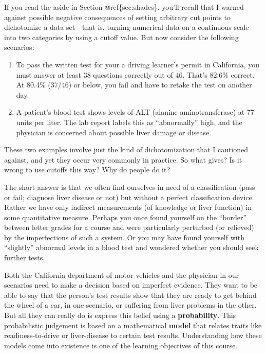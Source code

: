 \documentclass[]{book}
\begin{document}
If you read the aside in Section @ref\{sec:shades\}, you'll recall that I warned against possible negative consequences of setting arbitrary cut points to dichotomize a data set---that is, turning numerical data on a continuous scale into two categories by using a cutoff value. But now consider the following scenarios:

\begin{enumerate}
\def\labelenumi{\arabic{enumi})}
\item
  To pass the written test for your a driving learner's permit in California, you must answer at least 38 questions correctly out of 46. That's 82.6\% correct. At 80.4\% (37/46) or below, you fail and have to retake the test on another day.
\item
  A patient's blood test shows levels of ALT (alanine aminotransferase) at 77 units per liter. The lab report labels this as ``abnormally'' high, and the physician is concerned about possible liver damage or disease.
\end{enumerate}

These two examples involve just the kind of dichotomization that I cautioned against, and yet they occur very commonly in practice. So what gives? Is it wrong to use cutoffs this way? Why do people do it?

The short answer is that we often find ourselves in need of a classification (pass or fail; diagnose liver disease or not) but without a perfect classification device. Rather we have only indirect measurements (of knowledge or liver function) in some quantitative measure. Perhaps you once found yourself on the ``border'' between letter grades for a course and were particularly perturbed (or relieved) by the imperfections of such a system. Or you may have found yourself with ``slightly'' abnormal levels in a blood test and wondered whether you should seek further tests.

Both the California department of motor vehicles and the physician in our scenarios need to make a decision based on imperfect evidence. They want to be able to say that the person's test results show that they are ready to get behind the wheel of a car, in one scenario, or suffering from liver problems in the other. But all they can really do is express this belief using a \textbf{probability}. This probabilistic judgement is based on a mathematical \textbf{model} that relates traits like readiness-to-drive or liver-disease to certain test results. Understanding how these models come into existence is one of the learning objectives of this course.
\end{document}
